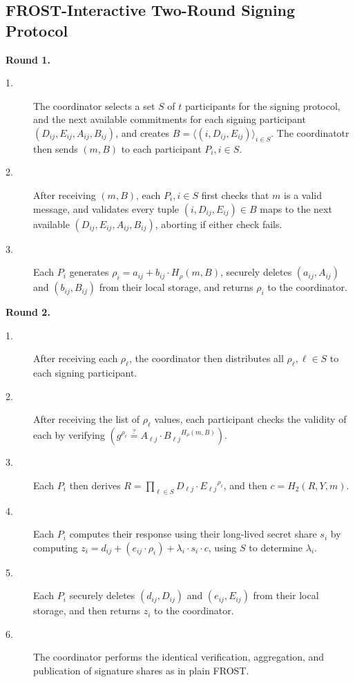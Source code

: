 \subsection{FROST-Interactive Two-Round Signing Protocol}
\label{sec:interactive-sign-parallel}


\noindent \textbf{Round 1.}
\begin{description}
  \item[1.] The coordinator selects a set $S$ of $t$ participants for the signing protocol, and
    the next available commitments for each signing participant $(D_{ij}, E_{ij},
    A_{ij}, B_{ij})$, and creates $B = \langle (i, D_{ij}, E_{ij})\rangle_{i \in S}$.
    The coordinatotr then sends $(m, B)$ to each participant $P_i, i
    \in S$.
  \item[2.] After receiving $(m, B)$, each $P_i, i \in S$ first checks that $m$ is
    a valid message, and validates every tuple $(i,D_{ij}, E_{ij}) \in B$ maps to the next
    available $(D_{ij}, E_{ij}, A_{ij}, B_{ij})$, aborting if either check fails.
  \item[3.] Each $P_i$ generates $\rho_i = a_{ij} + b_{ij} \cdot
    H_{\rho}(m,B)$, securely deletes
    $(a_{ij}, A_{ij})$ and $(b_{ij}, B_{ij})$ from their local storage,
    and returns $\rho_i$ to the coordinator.
\end{description}

\noindent \textbf{Round 2.}
\begin{description}
  \item[1.] After receiving each $\rho_\ell$, the coordinator then
    distributes all $\rho_\ell, \ell \in S$ to each signing participant.
  \item[2.] After receiving the list of $\rho_\ell$ values, each participant checks
    the validity of each by verifying $ (g^{\rho_\ell} \stackrel{?}{=}
    A_{\ell j}\cdot{B_{\ell j}}^{H_{\rho}(m, B)})$.
  \item[3.] Each $P_i$ then derives $R = \prod_{\ell \in S} D_{\ell j} \cdot {E_{\ell j}}^{\rho_\ell}$, and
    then $c = H_2(R, Y, m)$.
  \item[4.] Each $P_i$ computes their response using their long-lived
    secret share $s_i$
    by computing $z_i = d_{ij} + (e_{ij} \cdot \rho_i) + \lambda_i \cdot s_i
    \cdot c$, using $S$ to determine $\lambda_i$.
  \item[5.] Each $P_i$ securely deletes $(d_{ij}, D_{ij})$ and $(e_{ij}, E_{ij})$
    from their
    local storage, and then returns $z_i$ to the coordinator.
  \item[6.] The coordinator performs the identical verification, aggregation, and
    publication of signature shares as in plain FROST.
\end{description}

